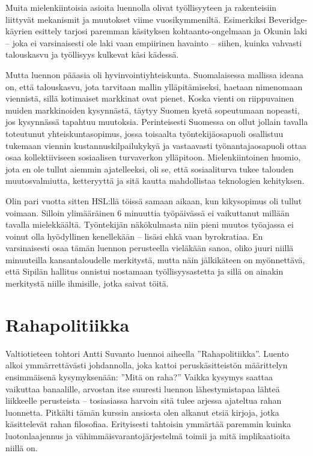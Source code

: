 \documentclass[12pt]{article}
\begin{document}
Muita mielenkiintoisia asioita luennolla olivat työllisyyteen ja rakenteisiin liittyvät mekanismit ja muutokset viime vuosikymmeniltä. Esimerkiksi Beveridge-käyrien esittely tarjosi paremman käsityksen kohtaanto-ongelmaan ja Okunin laki -- joka ei varsinaisesti ole laki vaan empiirinen havainto -- siihen, kuinka vahvasti talouskasvu ja työllisyys kulkevat käsi kädessä.

Mutta luennon pääasia oli hyvinvointiyhteiskunta. Suomalaisessa mallissa ideana on, että talouskasvu, jota tarvitaan mallin ylläpitämiseksi, haetaan nimenomaan viennistä, sillä kotimaiset markkinat ovat pienet. Koska vienti on riippuvainen muiden markkinoiden kysynnästä, täytyy Suomen kyetä sopeutumaan nopeasti, jos kysynnässä tapahtuu muutoksia. Perinteisesti Suomessa on ollut jollain tavalla toteutunut yhteiskuntasopimus, jossa toisaalta työntekijäosapuoli osallistuu tukemaan viennin kustannuskilpailukykyä ja vastaavasti työnantajaosapuoli ottaa osaa kollektiiviseen sosiaalisen turvaverkon ylläpitoon. Mielenkiintoinen huomio, jota en ole tullut aiemmin ajatelleeksi, oli se, että sosiaaliturva tukee talouden muutosvalmiutta, ketteryyttä ja sitä kautta mahdollistaa teknologien kehityksen.

Olin pari vuotta sitten HSL:llä töissä samaan aikaan, kun kikysopimus oli tullut voimaan. Silloin ylimääräinen 6 minuuttia työpäivässä ei vaikuttanut millään tavalla mielekkäältä. Työntekijän näkökulmasta niin pieni muutos työajassa ei voinut olla hyödyllinen kenellekään -- lisäsi ehkä vaan byrokratiaa. En varsinaisesti osaa tämän luennon perusteella vieläkään sanoa, oliko juuri niillä minuuteilla kansantaloudelle merkitystä, mutta näin jälkikäteen on myönnettävä, että Sipilän hallitus onnistui nostamaan työllisyysastetta ja sillä on ainakin merkitystä niille ihmisille, jotka saivat töitä.


\newpage
\section{Rahapolitiikka}

Valtiotieteen tohtori Antti Suvanto luennoi aiheella ''Rahapolitiikka''. Luento alkoi ymmärrettävästi johdannolla, joka kattoi peruskäsitteistön määrittelyn ensimmäisenä kysymyksenään: ''Mitä on raha?'' Vaikka kysymys saattaa vaikuttaa banaalille, arvostan itse suuresti luennon lähestymistapaa lähteä liikkeelle perusteista -- tosiasiassa harvoin sitä tulee arjessa ajateltua rahan luonnetta. Pitkälti tämän kurssin ansiosta olen alkanut etsiä kirjoja, jotka käsittelevät rahan filosofiaa. Erityisesti tahtoisin ymmärtää paremmin kuinka luotonlaajennus ja vähimmäisvarantojärjestelmä toimii ja mitä implikaatioita niillä on.
\end{document}
